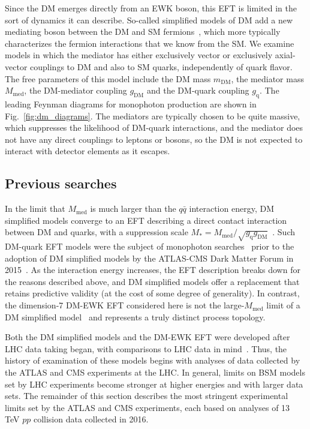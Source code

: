 \documentclass[oneside, letterpaper, 12pt, oldfontcommands]{memoir}
\begin{document}
Since the DM emerges directly from an EWK boson, this EFT is limited in the sort of dynamics it can describe. So-called simplified models of DM add
a new mediating boson between the DM and SM fermions~\cite{ref:1507.00966}, which more typically characterizes the fermion interactions that we know
from the SM. We examine models
in which the mediator has either exclusively vector or exclusively axial-vector couplings to DM and also to SM quarks, independently
of quark flavor. The free parameters of this model include
the DM mass $m_\mathrm{DM}$, the mediator mass $M_\mathrm{med}$, the DM-mediator coupling $g_\mathrm{DM}$ and the DM-quark coupling $g_\mathrm{q}$.
The leading Feynman diagrams for monophoton production are shown in Fig.~\ref{fig:dm_diagrams}. The mediators are typically chosen to be quite massive,
which suppresses the likelihood of DM-quark interactions, and the mediator does not have any direct couplings to leptons or bosons,
so the DM is not expected to interact with detector elements as it escapes.

\subsection{Previous searches} \label{sec:introduction_dm_previous_searches}
In the limit that $M_\mathrm{med}$ is much larger than the $q\bar{q}$ interaction energy, DM simplified models converge to an EFT describing a direct contact
interaction between DM and quarks, with a suppression scale $M_\mathrm{*} = M_\mathrm{med}/\sqrt{g_\mathrm{q}g_\mathrm{DM}}$~\cite{ref:1603.04156}.
Such DM-quark EFT models were the subject of monophoton searches~\cite{ref:j.physletb.2016.01.057, ref:PhysRevD.91.012008} prior to the adoption of
DM simplified models by the ATLAS-CMS Dark Matter Forum in 2015~\cite{ref:1507.00966}.
As the interaction energy increases, the EFT description breaks down for the reasons described above, and DM simplified models
offer a replacement that retains predictive validity (at the cost of some degree of generality).
In contrast, the dimension-7 DM-EWK EFT considered here is not the large-$M_\mathrm{med}$ limit of a DM simplified model~\cite{ref:1507.00966} and represents a truly distinct
process topology.

Both the DM simplified models and the DM-EWK EFT were developed after LHC data taking began, with comparisons to LHC data in mind~\cite{ref:1507.00966, ref:PhysRevD.89.056011}.
Thus, the history of examination of these models begins with analyses of data collected by the ATLAS and CMS experiments at the LHC.
In general, limits on BSM models set by LHC experiments become stronger at higher energies and with larger data sets.
The remainder of this section describes the most stringent experimental limits set by the ATLAS and CMS experiments, each based on analyses of 13 TeV $pp$ collision data
collected in 2016.
\end{document}
